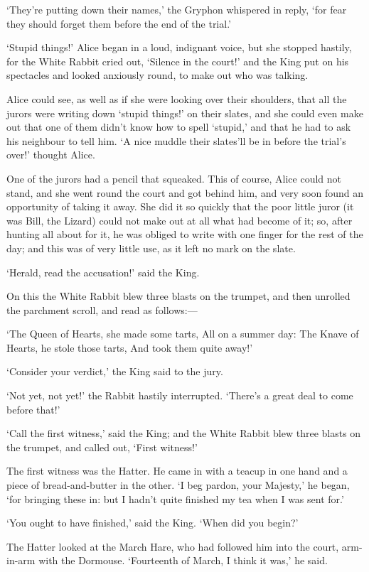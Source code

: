 \documentclass[12pt]{book}
\begin{document}
\begin{Parallel}[p]{}{}
{‘They’re putting down their names,’ the Gryphon whispered in reply, ‘for fear they should forget them before the end of the trial.’

‘Stupid things!’ Alice began in a loud, indignant voice, but she stopped hastily, for the White Rabbit cried out, ‘Silence in the court!’ and the King put on his spectacles and looked anxiously round, to make out who was talking.

Alice could see, as well as if she were looking over their shoulders, that all the jurors were writing down ‘stupid things!’ on their slates, and she could even make out that one of them didn’t know how to spell ‘stupid,’ and that he had to ask his neighbour to tell him. ‘A nice muddle their slates’ll be in before the trial’s over!’ thought Alice.

One of the jurors had a pencil that squeaked. This of course, Alice could not stand, and she went round the court and got behind him, and very soon found an opportunity of taking it away. She did it so quickly that the poor little juror (it was Bill, the Lizard) could not make out at all what had become of it; so, after hunting all about for it, he was obliged to write with one finger for the rest of the day; and this was of very little use, as it left no mark on the slate.

‘Herald, read the accusation!’ said the King.

On this the White Rabbit blew three blasts on the trumpet, and then unrolled the parchment scroll, and read as follows:—

   ‘The Queen of Hearts, she made some tarts,
      All on a summer day:
    The Knave of Hearts, he stole those tarts,
      And took them quite away!’

‘Consider your verdict,’ the King said to the jury.

‘Not yet, not yet!’ the Rabbit hastily interrupted. ‘There’s a great deal to come before that!’

‘Call the first witness,’ said the King; and the White Rabbit blew three blasts on the trumpet, and called out, ‘First witness!’

The first witness was the Hatter. He came in with a teacup in one hand and a piece of bread-and-butter in the other. ‘I beg pardon, your Majesty,’ he began, ‘for bringing these in: but I hadn’t quite finished my tea when I was sent for.’

‘You ought to have finished,’ said the King. ‘When did you begin?’

The Hatter looked at the March Hare, who had followed him into the court, arm-in-arm with the Dormouse. ‘Fourteenth of March, I think it was,’ he said.

}
\end{Parallel}
\end{document}
